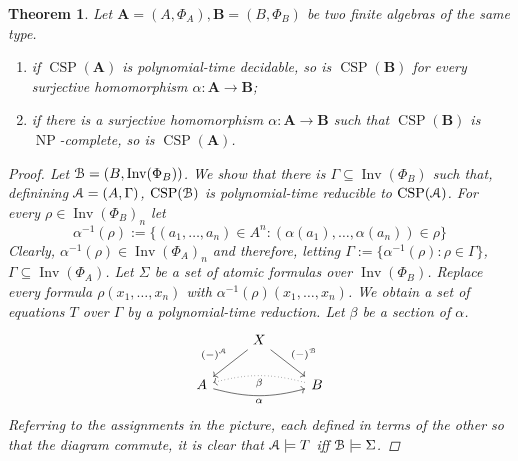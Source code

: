 \documentclass{amsart}
\theoremstyle{plain}
\newtheorem{theorem}{Theorem}[section]
\theoremstyle{definition}
\theoremstyle{remark}
\DeclareMathOperator{\CSP}{CSP}
\DeclareMathOperator{\Inv}{Inv}
\DeclareMathOperator{\NP}{NP}
\begin{document}
\begin{theorem}
    Let $\mathbf{A}=(A, \Phi_A), \mathbf{B}=(B, \Phi_B)$ be two finite algebras of the same type.  
    \begin{enumerate}
        \item if $\CSP(\mathbf{A})$ is polynomial-time decidable, so is $\CSP(\mathbf{B})$ for every surjective homomorphism $\alpha: \mathbf{A} \to \mathbf{B}$; 
        \item if there is a surjective homomorphism $\alpha: \mathbf{A} \to \mathbf{B}$ such that $\CSP(\mathbf{B})$ is $\NP$-complete, so is $\CSP(\mathbf{A})$. 
    \end{enumerate}
    \begin{proof}
        Let $\EuScript{B}=(B, \Inv(\Phi_B))$.
        We show that there is $\Gamma \subseteq \Inv(\Phi_B)$ such that, definining $\EuScript{A}=(A, \Gamma)$, $\CSP(\EuScript{B})$ is polynomial-time reducible to $\CSP(\EuScript{A})$. 
        For every $\rho \in \Inv(\Phi_B)_n$ let 
        \begin{equation*}
            \alpha^{-1}(\rho):=\{(a_1, \ldots, a_n) \in A^n : (\alpha(a_1), \ldots, \alpha(a_n)) \in \rho\}
        \end{equation*}
        Clearly, $\alpha^{-1}(\rho) \in \Inv(\Phi_A)_n$
        and therefore, letting $\Gamma:=\{\alpha^{-1}(\rho) : \rho \in \Gamma\}$, $\Gamma \subseteq \Inv(\Phi_A)$. 
        Let $\Sigma$ be a set of atomic formulas over $\Inv(\Phi_B)$. 
        Replace every formula $\rho(x_1, \ldots, x_n)$ with $\alpha^{-1}(\rho)(x_1, \ldots, x_n)$.       
        We obtain a set of equations $T$ over $\Gamma$ by a polynomial-time reduction. 
        Let $\beta$ be a section of $\alpha$.  
        \begin{equation*}
            \begin{tikzcd}
                & X \arrow[dl, "(-)^{\EuScript{A}}", swap] \arrow[dr, "(-)^{\EuScript{B}}"] & \\
                A \arrow[rr, bend right=15, "\alpha", swap] & & B \arrow[ll, bend right=15, dotted, "\beta"]
            \end{tikzcd}
        \end{equation*}
        Referring to the assignments in the picture, each defined in terms of the other so that the diagram commute, 
        it is clear that $\EuScript{A} \models T$ iff $\EuScript{B} \models \Sigma$. 
    \end{proof}
\end{theorem}
\end{document}

